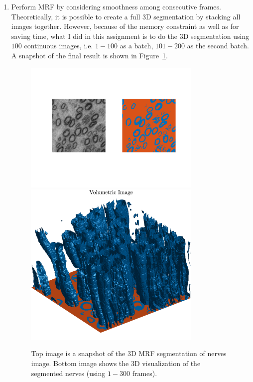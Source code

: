 \documentclass[a4paper]{article}
\begin{document}
\begin{enumerate}
	\item Perform MRF by considering smoothness among consecutive frames. Theoretically, it is possible to create a full 3D segmentation by stacking all images together. However, because of the memory constraint as well as for saving time, what I did in this assignment is to do the 3D segmentation using $100$ continuous images, i.e. $1-100$ as a batch, $101-200$ as the second batch. A snapshot of the final result is shown in Figure~\ref{final2}.
	
	\begin{figure}[!b]
	\centering
	\includegraphics[width=0.8\textwidth]{./figures/2.png}
	\includegraphics[width=0.8\textwidth]{./figures/final_res2.png}
	\caption{Top image is a snapshot of the $3$D MRF segmentation of nerves image. Bottom image shows the 3D visualization of the segmented nerves (using $1-300$ frames).}
	\label{final2}
\end{figure}	


\end{enumerate}
\end{document}
